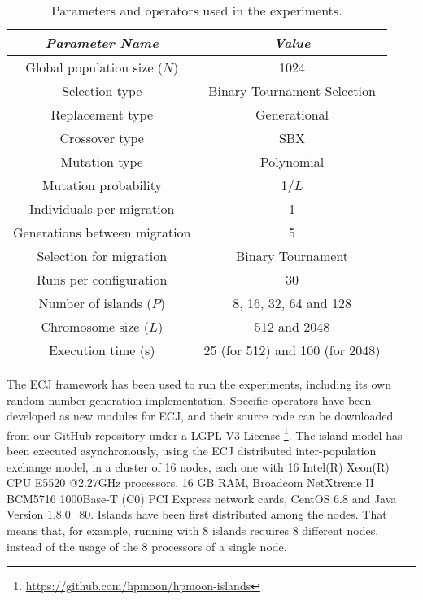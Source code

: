 \documentclass[preprint]{elsarticle}
\begin{document}
\begin{table*}
\begin{center}
\begin{tabular}{|c|c|}
\hline
{\em Parameter Name} & {\em Value} \\ \hline
Global population size ($N$) & 1024 \\ \hline
Selection type & Binary Tournament Selection \\ \hline
Replacement type & Generational \\ \hline 
Crossover type & SBX \\ \hline
Mutation  type & Polynomial\\ \hline
Mutation probability & 1/$L$ \\ \hline
Individuals per migration & 1 \\ \hline
Generations between migration & 5 \\ \hline
Selection for migration & Binary Tournament\\ \hline
Runs per configuration & 30 \\ \hline \hline
Number of islands ($P$) & 8, 16, 32, 64 and 128 \\ \hline
Chromosome size ($L$) & 512 and 2048 \\ \hline
Execution time (s) & 25 (for 512) and 100 (for 2048) \\ \hline \hline
\end{tabular}
\caption{Parameters and operators used in the experiments.}
\label{tab:parameters}
\end{center}
\end{table*}

The ECJ framework \citep{ECJ} has been used to run the
experiments, including its own random number generation implementation. Specific operators have been developed as new modules for
ECJ, and their source code can be downloaded from our GitHub repository under a
LGPL V3 License
\footnote{\url{https://github.com/hpmoon/hpmoon-islands}}. 
The
island model has been executed asynchronously, using the ECJ distributed inter-population exchange
 model, in a cluster of 16 nodes, each one with 16 Intel(R) Xeon(R) CPU E5520
@2.27GHz processors, 16 GB RAM, Broadcom NetXtreme II BCM5716 1000Base-T (C0) PCI Express network cards, CentOS 6.8 and Java Version 1.8.0\_80. Islands have been first distributed among the nodes. That means that, for example, running with 8 islands requires 8 different nodes, instead of the usage of the 8 processors of a single node.
\end{document}
